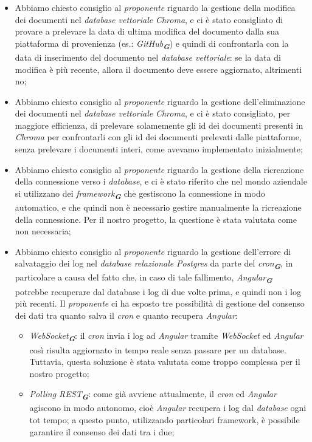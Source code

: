 \begin{itemize}
    \item Abbiamo chiesto consiglio al \emph{proponente} riguardo la gestione della modifica dei documenti nel \emph{database vettoriale} \emph{Chroma}, e ci è stato consigliato di provare a prelevare la data di ultima modifica del documento dalla sua piattaforma di provenienza (es.: \emph{GitHub}\textsubscript{\textbf{\textit{G}}}) e quindi di confrontarla con la data di inserimento del documento nel \emph{database vettoriale}: se la data di modifica è più recente, allora il documento deve essere aggiornato, altrimenti no;
    \item Abbiamo chiesto consiglio al \emph{proponente} riguardo la gestione dell'eliminazione dei documenti nel \emph{database vettoriale} \emph{Chroma}, e ci è stato consigliato, per maggiore efficienza, di prelevare solamemente gli id dei documenti presenti in \emph{Chroma} per confrontarli con gli id dei documenti prelevati dalle piattaforme, senza prelevare i documenti interi, come avevamo implementato inizialmente;
    \item Abbiamo chiesto consiglio al \emph{proponente} riguardo la gestione della ricreazione della connessione verso i \emph{database}, e ci è stato riferito che nel mondo aziendale si utilizzano dei \emph{framework}\textsubscript{\textbf{\textit{G}}} che gestiscono la connessione in modo automatico, e che quindi non è necessario gestire manualmente la ricreazione della connessione. Per il nostro progetto, la questione è stata valutata come non necessaria;
    \item Abbiamo chiesto consiglio al \emph{proponente} riguardo la gestione dell'errore di salvataggio dei log nel \emph{database relazionale} \emph{Postgres} da parte del \emph{cron}\textsubscript{\textbf{\textit{G}}}, in particolare a causa del fatto che, in caso di tale fallimento, \emph{Angular}\textsubscript{\textbf{\textit{G}}} potrebbe recuperare dal database i log di due volte prima, e quindi non i log più recenti. Il \emph{proponente} ci ha esposto tre possibilità di gestione del consenso dei dati tra quanto salva il \emph{cron} e quanto recupera \emph{Angular}:
        \begin{itemize}
            \item \emph{WebSocket}\textsubscript{\textbf{\textit{G}}}: il \emph{cron} invia i log ad \emph{Angular} tramite \emph{WebSocket} ed \emph{Angular} così risulta aggiornato in tempo reale senza passare per un database. Tuttavia, questa soluzione è stata valutata come troppo complessa per il nostro progetto;
            \item \emph{Polling REST}\textsubscript{\textbf{\textit{G}}}: come già avviene attualmente, il \emph{cron} ed \emph{Angular} agiscono in modo autonomo, cioè \emph{Angular} recupera i log dal \emph{database} ogni tot tempo; a questo punto, utilizzando particolari framework, è possibile garantire il consenso dei dati tra i due;

\end{itemize}
\end{itemize}
